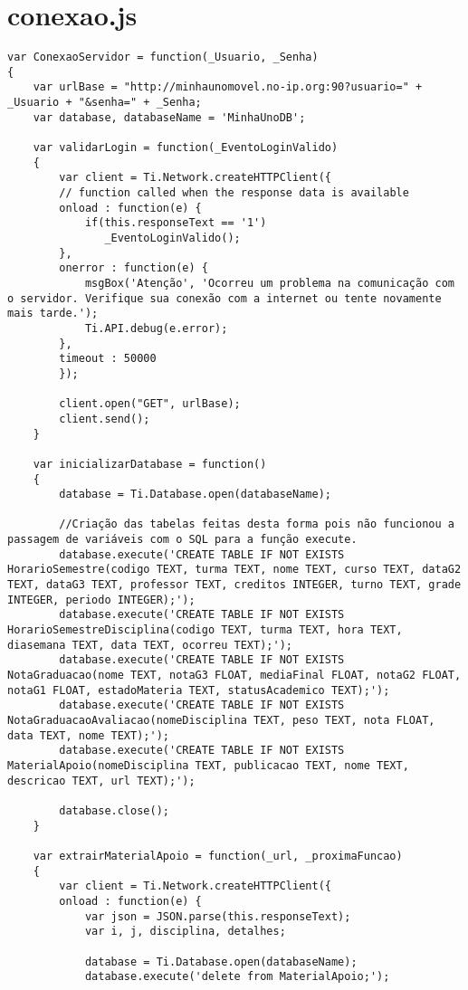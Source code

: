 \section{conexao.js}
\begin{lstlisting}
var ConexaoServidor = function(_Usuario, _Senha)
{
	var urlBase = "http://minhaunomovel.no-ip.org:90?usuario=" + _Usuario + "&senha=" + _Senha;	
	var database, databaseName = 'MinhaUnoDB';
		
 	var validarLogin = function(_EventoLoginValido)
 	{
 		var client = Ti.Network.createHTTPClient({
     	// function called when the response data is available
    	onload : function(e) {
     		if(this.responseText == '1')
     		   _EventoLoginValido();			         			
    	},
     	onerror : function(e) {
     		msgBox('Atenção', 'Ocorreu um problema na comunicação com o servidor. Verifique sua conexão com a internet ou tente novamente mais tarde.');
         	Ti.API.debug(e.error);
    	},
     	timeout : 50000 
 		});
 	
		client.open("GET", urlBase);
 		client.send();  
 	}
 	
 	var inicializarDatabase = function()
 	{
		database = Ti.Database.open(databaseName);
		
		//Criação das tabelas feitas desta forma pois não funcionou a passagem de variáveis com o SQL para a função execute.
		database.execute('CREATE TABLE IF NOT EXISTS HorarioSemestre(codigo TEXT, turma TEXT, nome TEXT, curso TEXT, dataG2 TEXT, dataG3 TEXT, professor TEXT, creditos INTEGER, turno TEXT, grade INTEGER, periodo INTEGER);');
		database.execute('CREATE TABLE IF NOT EXISTS HorarioSemestreDisciplina(codigo TEXT, turma TEXT, hora TEXT, diasemana TEXT, data TEXT, ocorreu TEXT);');
		database.execute('CREATE TABLE IF NOT EXISTS NotaGraduacao(nome TEXT, notaG3 FLOAT, mediaFinal FLOAT, notaG2 FLOAT, notaG1 FLOAT, estadoMateria TEXT, statusAcademico TEXT);');
		database.execute('CREATE TABLE IF NOT EXISTS NotaGraduacaoAvaliacao(nomeDisciplina TEXT, peso TEXT, nota FLOAT, data TEXT, nome TEXT);');
		database.execute('CREATE TABLE IF NOT EXISTS MaterialApoio(nomeDisciplina TEXT, publicacao TEXT, nome TEXT, descricao TEXT, url TEXT);');
		
		database.close();
 	}
 	
 	var extrairMaterialApoio = function(_url, _proximaFuncao)
 	{
 		var client = Ti.Network.createHTTPClient({
    	onload : function(e) {
     		var json = JSON.parse(this.responseText);
			var i, j, disciplina, detalhes;
			
			database = Ti.Database.open(databaseName);
			database.execute('delete from MaterialApoio;');
			

\end{lstlisting}
